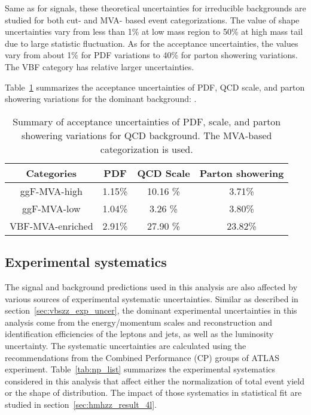 Same as for signals, these theoretical uncertainties for irreducible backgrounds are studied for both cut- and MVA- based event categorizations.
The value of shape uncertainties vary from less than 1\% at low mass region to 50\% at high mass tail due to large statistic fluctuation.
As for the acceptance uncertainties, the values vary from about 1\% for PDF variations to 40\% for parton showering variations.
The VBF category has relative larger uncertainties.

Table~\ref{tab:acc-all-qqZZ_MVA} summarizes the acceptance uncertainties of PDF, QCD scale, and parton showering variations for the dominant background: \qqZZ.

\begin{table}[htbp]
  \centering
  \caption{Summary of acceptance uncertainties of PDF, scale, and parton showering variations for QCD \qqZZ background. The MVA-based categorization is used.}
  \label{tab:acc-all-qqZZ_MVA}
  \begin{spacing}{0.75}
  \begin{tabular}{cccc}
    \toprule
    Categories  & PDF    & QCD Scale   & Parton showering \\
    \midrule
    ggF-MVA-high  & 1.15\% & 10.16 \% & 3.71\% \\
    ggF-MVA-low   & 1.04\% & 3.26  \% & 3.80\% \\
    VBF-MVA-enriched  & 2.91\% & 27.90 \% & 23.82\% \\
    \bottomrule
  \end{tabular}
  \end{spacing}
\end{table}

\subsection{Experimental systematics}

The signal and background predictions used in this analysis are also affected by various sources of experimental systematic uncertainties.
Similar as described in section~\ref{sec:vbszz_exp_uncer}, the dominant experimental uncertainties in this analysis come from the energy/momentum scales 
and reconstruction and identification efficiencies of the leptons and jets, as well as the luminosity uncertainty.
The systematic uncertainties are calculated using the recommendations from the Combined Performance (CP) groups of ATLAS experiment.
Table~\ref{tab:np_list} summarizes the experimental systematics considered in this analysis that affect either the normalization of total event yield or the shape of \mfl distribution.
The impact of those systematics in statistical fit are studied in section~\ref{sec:hmhzz_result_4l}.

